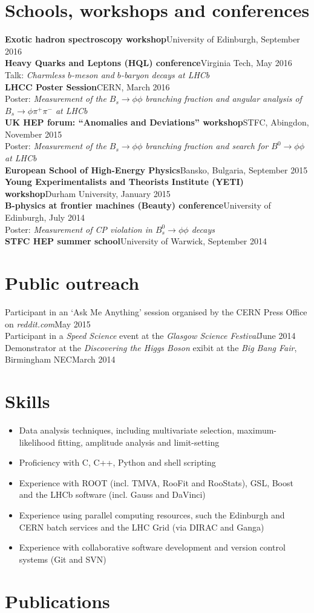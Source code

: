 \documentclass{simplecv}
\newcommand\dateditem[2]{#1\hfill#2\\}
\newcommand\topictitle[3]{\dateditem{{\bf{}#1}}{#3}#2}
\begin{document}
	\section{Schools, workshops and conferences}
	\topictitle{Exotic hadron spectroscopy workshop}{}{University of Edinburgh, September 2016}[0.5em]
	\topictitle{Heavy Quarks and Leptons (HQL) conference}{Talk: {\it Charmless $b$-meson and $b$-baryon decays at LHCb}}{Virginia Tech, May 2016}\\[0.5em]
	\topictitle{LHCC Poster Session}{Poster: {\it Measurement of the $B_s \to \phi \phi$ branching fraction and angular analysis of $B_s \to \phi \pi^{+} \pi^{-}$ at LHCb}}{CERN, March 2016}\\[0.5em]
	\topictitle{UK HEP forum: ``Anomalies and Deviations'' workshop}{Poster: {\it Measurement of the $B_s \to \phi \phi$ branching fraction and search for $B^0 \to \phi \phi$ at LHCb}}{STFC, Abingdon, November 2015}\\[0.5em]
	\topictitle{European School of High-Energy Physics}{}{Bansko, Bulgaria, September 2015}[0.5em]
	\topictitle{Young Experimentalists and Theorists Institute (YETI) workshop}{}{Durham University, January 2015}[0.5em]
	\topictitle{B-physics at frontier machines (Beauty) conference}{Poster: {\it Measurement of CP violation in $B^0_s \to \phi\phi$ decays}}{University of Edinburgh, July 2014}\\[0.5em]
	\topictitle{STFC HEP summer school}{}{University of Warwick, September 2014}[0.5em]
	\section{Public outreach}
	\dateditem{Participant in an `Ask Me Anything' session organised by the CERN Press Office on {\it reddit.com}}{May 2015}
	\dateditem{Participant in a {\it Speed Science} event at the {\it Glasgow Science Festival}}{June 2014}
	\dateditem{Demonstrator at the {\it Discovering the Higgs Boson} exibit at the {\it Big Bang Fair}, Birmingham NEC}{March 2014}
	\section{Skills}
	\begin{itemize}
		\itemsep-0.3em
		\item Data analysis techniques, including multivariate selection, maximum-likelihood fitting, amplitude analysis and limit-setting
		\item Proficiency with C, C++, Python and shell scripting
		\item Experience with ROOT (incl. TMVA, RooFit and RooStats), GSL, Boost and the LHCb software (incl. Gauss and DaVinci)
		\item Experience using parallel computing resources, such the Edinburgh and CERN batch services and the LHC Grid (via DIRAC and Ganga)
		\item Experience with collaborative software development and version control systems (Git and SVN)
	\end{itemize}
	\section{Publications}
\end{document}
